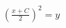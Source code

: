 \documentclass[preview]{standalone}
\begin{document}
\begin{align*}
\left(\frac{x + C}{2}\right)^2 = y
\end{align*}
\end{document}
